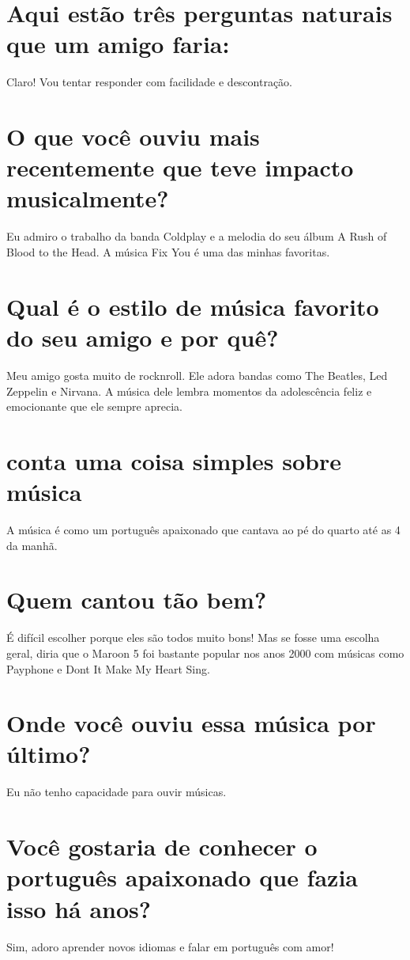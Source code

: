 \documentclass[11pt,a4paper]{article}
\begin{document}
\section{Aqui estão três perguntas naturais que um amigo faria:}
Claro! Vou tentar responder com facilidade e descontração.

\section{O que você ouviu mais recentemente que teve impacto musicalmente?}
Eu admiro o trabalho da banda Coldplay e a melodia do seu álbum A Rush of Blood to the Head. A música Fix You é uma das minhas favoritas.

\section{Qual é o estilo de música favorito do seu amigo e por quê?}
Meu amigo gosta muito de rocknroll. Ele adora bandas como The Beatles, Led Zeppelin e Nirvana. A música dele lembra momentos da adolescência feliz e emocionante que ele sempre aprecia.

\section{conta uma coisa simples sobre música}
A música é como um português apaixonado que cantava ao pé do quarto até as 4 da manhã.

\section{Quem cantou tão bem?}
É difícil escolher porque eles são todos muito bons! Mas se fosse uma escolha geral, diria que o Maroon 5 foi bastante popular nos anos 2000 com músicas como Payphone e Dont It Make My Heart Sing.

\section{Onde você ouviu essa música por último?}
Eu não tenho capacidade para ouvir músicas.

\section{Você gostaria de conhecer o português apaixonado que fazia isso há anos?}
Sim, adoro aprender novos idiomas e falar em português com amor!
\end{document}
